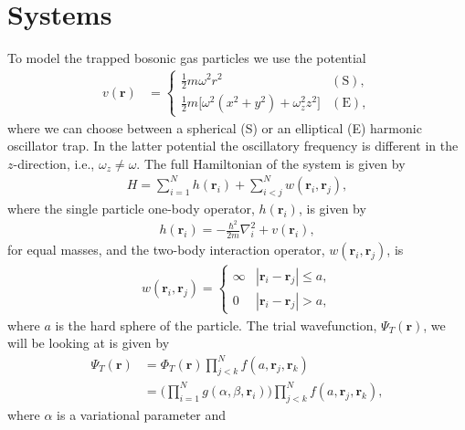\documentclass[
    a4paper, aps, twocolumn, floatfix, superscriptaddress,
    nofootinbib]{revtex4-1}
\newcommand{\vf}{\mathbf}
\newcommand{\1}{\mathds{1}}
\newcommand{\half}{\frac{1}{2}}
\begin{document}
\section{Systems}
    To model the trapped bosonic gas particles we use the potential
    \begin{align}
        v(\vf{r})
        &=
        \begin{cases}
            \half m\omega^2r^2 & (\text{S}), \\
            \half m \bigl[
                \omega^2(x^2 + y^2) + \omega_z^2z^2
            \bigr] & (\text{E}),
        \end{cases}
    \end{align}
    where we can choose between a spherical (S) or an elliptical (E) harmonic
    oscillator trap.  In the latter potential the oscillatory frequency is
    different in the $z$-direction, i.e., $\omega_z \neq \omega$.  The full
    Hamiltonian of the system is given by
    \begin{align}
        H = \sum_{i = 1}^{N}h(\vf{r}_i) + \sum_{i < j}^{N}w(\vf{r}_i, \vf{r}_j),
    \end{align}
    where the single particle one-body operator, $h(\vf{r}_i)$, is given by
    \begin{align}
        h(\vf{r}_i) = -\frac{\hbar^2}{2m}\nabla_i^2
        + v(\vf{r}_i),
    \end{align}
    for equal masses, and the two-body interaction operator, $w(\vf{r}_i,
    \vf{r}_j)$, is
    \begin{align}
        w(\vf{r}_i, \vf{r}_j)
        = \begin{cases}
            \infty & |\vf{r}_i - \vf{r}_j| \leq a, \\
            0 & |\vf{r}_i - \vf{r}_j| > a,
        \end{cases}
        \label{eq:two-body_interaction}
    \end{align}
    where $a$ is the hard sphere of the particle.  The trial wavefunction,
    $\Psi_T(\vf{r})$, we will be looking at is given by
    \begin{align}
        \Psi_T(\vf{r})
        &= \Phi_T(\vf{r})
        \prod_{j < k}^N f(a, \vf{r}_j, \vf{r}_k) \\
        &= \Biggl(
            \prod_{i = 1}^N g(\alpha, \beta, \vf{r}_i)
        \Biggr)
        \prod_{j < k}^N f(a, \vf{r}_j, \vf{r}_k),
        \label{eq:initial_trial_wavefunction}
    \end{align}
    where $\alpha$ is a variational parameter and
\end{document}
